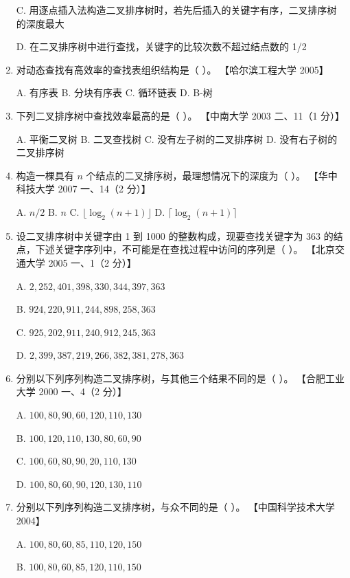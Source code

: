 \documentclass[lang=cn,newtx,10pt,scheme=chinese]{../../elegantbook}
\begin{document}
\begin{enumerate}
    C. 用逐点插入法构造二叉排序树时，若先后插入的关键字有序，二叉排序树的深度最大  

    D. 在二叉排序树中进行查找，关键字的比较次数不超过结点数的 1/2  

    \item 对动态查找有高效率的查找表组织结构是（ ）。  
    【哈尔滨工程大学 2005】  

    A. 有序表 \quad B. 分块有序表 \quad C. 循环链表 \quad D. B-树  

    \item 下列二叉排序树中查找效率最高的是（ ）。  
    【中南大学 2003 二、11（1 分）】  

    A. 平衡二叉树 \quad B. 二叉查找树 \quad C. 没有左子树的二叉排序树 \quad D. 没有右子树的二叉排序树  

    \item 构造一棵具有 $n$ 个结点的二叉排序树，最理想情况下的深度为（ ）。  
    【华中科技大学 2007 一、14（2 分）】 

    A. $n/2$ \quad B. $n$ \quad C. $\lfloor \log_2(n+1) \rfloor$ \quad   D. $\lceil \log_2(n+1) \rceil$ 

    \item 设二叉排序树中关键字由 1 到 1000 的整数构成，现要查找关键字为 363 的结点，下述关键字序列中，不可能是在查找过程中访问的序列是（ ）。  
    【北京交通大学 2005 一、1（2 分）】  

    A. $2, 252, 401, 398, 330, 344, 397, 363$  

    B. $924, 220, 911, 244, 898, 258, 363$  

    C. $925, 202, 911, 240, 912, 245, 363$  

    D. $2, 399, 387, 219, 266, 382, 381, 278, 363$  

    \item 分别以下列序列构造二叉排序树，与其他三个结果不同的是（ ）。  
    【合肥工业大学 2000 一、4（2 分）】 

    A. $100, 80, 90, 60, 120, 110, 130$  

    B. $100, 120, 110, 130, 80, 60, 90$  

    C. $100, 60, 80, 90, 20, 110, 130$  

    D. $100, 80, 60, 90, 120, 130, 110$  

    \item 分别以下列序列构造二叉排序树，与众不同的是（ ）。  
    【中国科学技术大学 2004】  

    A. $100, 80, 60, 85, 110, 120, 150$  

    B. $100, 80, 60, 85, 120, 110, 150$  


\end{enumerate}
\end{document}
